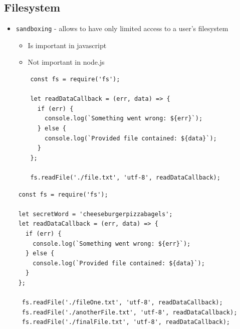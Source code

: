 \documentclass[12pt]{article}
\begin{document}
\subsection{Filesystem}
\begin{itemize}
    \item \texttt{sandboxing} - allows to have only limited access to a user’s filesystem
    \begin{itemize}
        \item Is important in javascript
        \item Not important in node.js
    \end{itemize}
\begin{lstlisting}
    const fs = require('fs');

    let readDataCallback = (err, data) => {
      if (err) {
        console.log(`Something went wrong: ${err}`);
      } else {
        console.log(`Provided file contained: ${data}`);
      }
    };

    fs.readFile('./file.txt', 'utf-8', readDataCallback);
\end{lstlisting}
\end{itemize}

\begin{lstlisting}
    const fs = require('fs');

    let secretWord = 'cheeseburgerpizzabagels';
    let readDataCallback = (err, data) => {
      if (err) {
        console.log(`Something went wrong: ${err}`);
      } else {
        console.log(`Provided file contained: ${data}`);
      }
    };

     fs.readFile('./fileOne.txt', 'utf-8', readDataCallback);
     fs.readFile('./anotherFile.txt', 'utf-8', readDataCallback);
     fs.readFile('./finalFile.txt', 'utf-8', readDataCallback);
\end{lstlisting}
\end{document}
